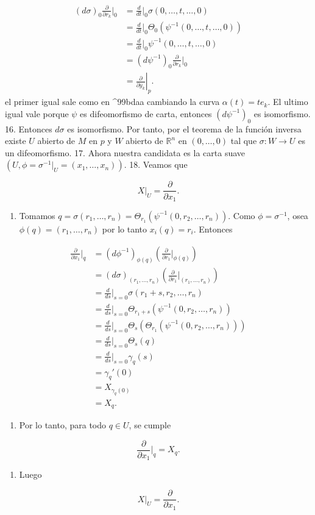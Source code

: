 \begin{bookproof}{}
\[
\begin{aligned}(d\sigma)_0\frac{\partial}{\partial r_k}\bigg|_0 &=\frac{d}{dt}\bigg|_0\sigma(0,\ldots,t,\ldots,0)\\ &=\frac{d}{dt}\bigg|_0\Theta_{0}\left(\psi^{-1}(0,\ldots,t,\ldots,0)\right)\\ &=\frac{d}{dt}\bigg|_0\psi^{-1}(0,\ldots,t,\ldots,0)\\ &=(d\psi^{-1})_0\frac{\partial}{\partial r_k}\bigg|_0\\ &=\left.\frac{\partial}{\partial y_k}\right|_p. \end{aligned}
\]
el primer igual sale como en \textasciicircum{}99bdaa cambiando la curva $\alpha(t)=te_{k}$. El ultimo igual vale porque $\psi$ es difeomorfismo de carta, entonces $(d\psi^{-1})_0$ es isomorfismo. 16. Entonces $d\sigma$ es isomorfismo. Por tanto, por el teorema de la función inversa existe $U$ abierto de $M$ en $p$ y $W$ abierto de $\mathbb R^n$ en $(0,\dots,0)$ tal que $\sigma:W\to U$ es un difeomorfismo. 17. Ahora nuestra candidata es la carta suave $(U,\phi=\sigma^{-1}|_U=(x_1,\dots,x_n)).$ 18. Veamos que

\[
X|_U=\frac{\partial}{\partial x_1}.
\]
\begin{enumerate}[start=19]
\item Tomamos $q=\sigma(r_1,\ldots,r_n)=\Theta_{r_1}\left(\psi^{-1}(0,r_2,\ldots,r_n)\right).$ Como $\phi=\sigma^{-1}$, osea $\phi(q)=(r_{1},\ldots,r_{n})$ por lo tanto $x_{i}(q)=r_{i}$. Entonces
\end{enumerate}
\[
\begin{aligned}\frac{\partial}{\partial x_1}\bigg|_q&=(d\phi ^{-1})_{\phi(q)}\left(\frac{\partial}{\partial r_{1}}\bigg|_{\phi(q)}\right)\\&=(d\sigma)_{(r_1,\ldots,r_n)}\left(\frac{\partial}{\partial r_1}\bigg|_{(r_1,\ldots,r_n)}\right)\\&=\frac{d}{ds}\bigg|_{s=0}\sigma(r_1+s,r_2,\ldots,r_n)\\&=\frac{d}{ds}\bigg|_{s=0}\Theta_{r_1+s}\left(\psi^{-1}(0,r_2,\ldots,r_n)\right)\\&=\frac{d}{ds}\bigg|_{s=0}\Theta_s\left(\Theta_{r_1}\left(\psi^{-1}(0,r_2,\ldots,r_n)\right)\right)\\&=\frac{d}{ds}\bigg|_{s=0}\Theta_s(q)\\&=\frac{d}{ds}\bigg|_{s=0}\gamma_q(s)\\&=\gamma_q'(0)\\&=X_{\gamma_q(0)}\\&=X_q.\end{aligned}
\]
\begin{enumerate}[start=20]
\item Por lo tanto, para todo $q\in U$, se cumple
\end{enumerate}
\[
\frac{\partial}{\partial x_1}\bigg|_q=X_q.
\]
\begin{enumerate}[start=21]
\item Luego
\end{enumerate}
\[
X|_U=\frac{\partial}{\partial x_1}.
\]
\bookqed
\end{bookproof}
